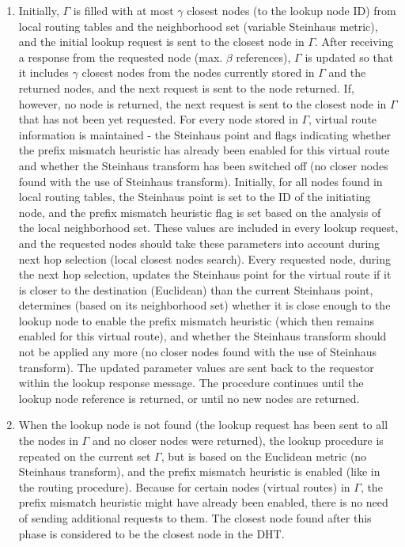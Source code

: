 \begin{enumerate}

\item Initially, $\Gamma$ is filled with at most $\gamma$ closest nodes (to the lookup node ID) from local routing tables and the neighborhood set (variable Steinhaus metric), and the initial lookup request is sent to the closest node in $\Gamma$. After receiving a response from the requested node (max. $\beta$ references), $\Gamma$ is updated so that it includes $\gamma$ closest nodes from the nodes currently stored in $\Gamma$ and the returned nodes, and the next request is sent to the node returned. If, however, no node is returned, the next request is sent to the closest node in $\Gamma$ that has not been yet requested.
For every node stored in $\Gamma$, virtual route information is maintained - the Steinhaus point and flags indicating whether the prefix mismatch heuristic has already been enabled for this virtual route and whether the Steinhaus transform has been switched off (no closer nodes found with the use of Steinhaus transform). Initially, for all nodes found in local routing tables, the Steinhaus point is set to the ID of the initiating node, and the prefix mismatch heuristic flag is set based on the analysis of the local neighborhood set. These values are included in every lookup request, and the requested nodes should take these parameters into account during next hop selection (local closest nodes search). Every requested node, during the next hop selection, updates the Steinhaus point for the virtual route if it is closer to the destination (Euclidean) than the current Steinhaus point, determines (based on its neighborhood set) whether it is close enough to the lookup node to enable the prefix mismatch heuristic (which then remains enabled for this virtual route), and whether the Steinhaus transform should not be applied any more (no closer nodes found with the use of Steinhaus transform). The updated parameter values are sent back to the requestor within the lookup response message. The procedure continues until the lookup node reference is returned, or until no new nodes are returned.

\smallskip
\item When the lookup node is not found (the lookup request has been sent to all the nodes in $\Gamma$ and no closer nodes were returned), the lookup procedure is repeated on the current set $\Gamma$, but is based on the Euclidean metric (no Steinhaus transform), and the prefix mismatch heuristic is enabled (like in the routing procedure). Because for certain nodes (virtual routes) in $\Gamma$, the prefix mismatch heuristic might have already been enabled, there is no need of sending additional requests to them. The closest node found after this phase is considered to be the closest node in the DHT.

\end{enumerate}

